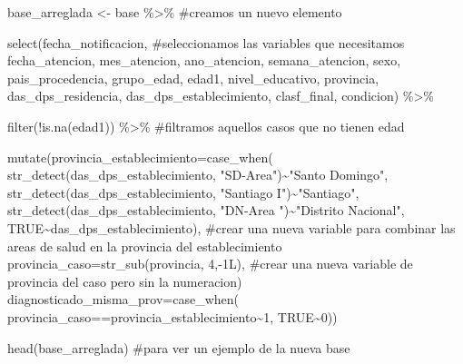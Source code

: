 \documentclass[
  letterpaper,
  DIV=11,
  numbers=noendperiod]{scrreprt}
\newenvironment{Shaded}{\begin{snugshade}}{\end{snugshade}}
\newcommand{\AttributeTok}[1]{\textcolor[rgb]{0.40,0.45,0.13}{#1}}
\newcommand{\CommentTok}[1]{\textcolor[rgb]{0.37,0.37,0.37}{#1}}
\newcommand{\ConstantTok}[1]{\textcolor[rgb]{0.56,0.35,0.01}{#1}}
\newcommand{\DecValTok}[1]{\textcolor[rgb]{0.68,0.00,0.00}{#1}}
\newcommand{\FunctionTok}[1]{\textcolor[rgb]{0.28,0.35,0.67}{#1}}
\newcommand{\NormalTok}[1]{\textcolor[rgb]{0.00,0.23,0.31}{#1}}
\newcommand{\OtherTok}[1]{\textcolor[rgb]{0.00,0.23,0.31}{#1}}
\newcommand{\SpecialCharTok}[1]{\textcolor[rgb]{0.37,0.37,0.37}{#1}}
\newcommand{\StringTok}[1]{\textcolor[rgb]{0.13,0.47,0.30}{#1}}
\begin{document}
\begin{Shaded}
\begin{Highlighting}[]
\NormalTok{base\_arreglada }\OtherTok{\textless{}{-}}\NormalTok{ base }\SpecialCharTok{\%\textgreater{}\%} \CommentTok{\#creamos un nuevo elemento}

  \FunctionTok{select}\NormalTok{(fecha\_notificacion, }\CommentTok{\#seleccionamos las variables que necesitamos}
\NormalTok{         fecha\_atencion,}
\NormalTok{         mes\_atencion,}
\NormalTok{         ano\_atencion,}
\NormalTok{         semana\_atencion,}
\NormalTok{         sexo,}
\NormalTok{         pais\_procedencia,}
\NormalTok{         grupo\_edad,}
\NormalTok{         edad1,}
\NormalTok{         nivel\_educativo,}
\NormalTok{         provincia,}
\NormalTok{         das\_dps\_residencia,}
\NormalTok{         das\_dps\_establecimiento,}
\NormalTok{         clasf\_final,}
\NormalTok{         condicion) }\SpecialCharTok{\%\textgreater{}\%} 
  
  \FunctionTok{filter}\NormalTok{(}\SpecialCharTok{!}\FunctionTok{is.na}\NormalTok{(edad1)) }\SpecialCharTok{\%\textgreater{}\%}  \CommentTok{\#filtramos aquellos casos que no tienen edad}
  
  \FunctionTok{mutate}\NormalTok{(}\AttributeTok{provincia\_establecimiento=}\FunctionTok{case\_when}\NormalTok{(}
             \FunctionTok{str\_detect}\NormalTok{(das\_dps\_establecimiento, }\StringTok{"SD{-}Area"}\NormalTok{)}\SpecialCharTok{\textasciitilde{}}\StringTok{"Santo Domingo"}\NormalTok{,}
             \FunctionTok{str\_detect}\NormalTok{(das\_dps\_establecimiento, }\StringTok{"Santiago I"}\NormalTok{)}\SpecialCharTok{\textasciitilde{}}\StringTok{"Santiago"}\NormalTok{,}
             \FunctionTok{str\_detect}\NormalTok{(das\_dps\_establecimiento, }\StringTok{"DN{-}Area "}\NormalTok{)}\SpecialCharTok{\textasciitilde{}}\StringTok{"Distrito Nacional"}\NormalTok{,}
             \ConstantTok{TRUE}\SpecialCharTok{\textasciitilde{}}\NormalTok{das\_dps\_establecimiento), }\CommentTok{\#crear una nueva variable para combinar las areas de salud en la provincia del establecimiento}
         \AttributeTok{provincia\_caso=}\FunctionTok{str\_sub}\NormalTok{(provincia, }\DecValTok{4}\NormalTok{,}\SpecialCharTok{{-}}\DecValTok{1}\NormalTok{L), }\CommentTok{\#crear una nueva variable de provincia del caso pero sin la numeracion)}
         \AttributeTok{diagnosticado\_misma\_prov=}\FunctionTok{case\_when}\NormalTok{(}
\NormalTok{              provincia\_caso}\SpecialCharTok{==}\NormalTok{provincia\_establecimiento}\SpecialCharTok{\textasciitilde{}}\DecValTok{1}\NormalTok{,}
                                            \ConstantTok{TRUE}\SpecialCharTok{\textasciitilde{}}\DecValTok{0}\NormalTok{))}
  
  \FunctionTok{head}\NormalTok{(base\_arreglada) }\CommentTok{\#para ver un ejemplo de la nueva base}
\end{Highlighting}
\end{Shaded}
\end{document}
